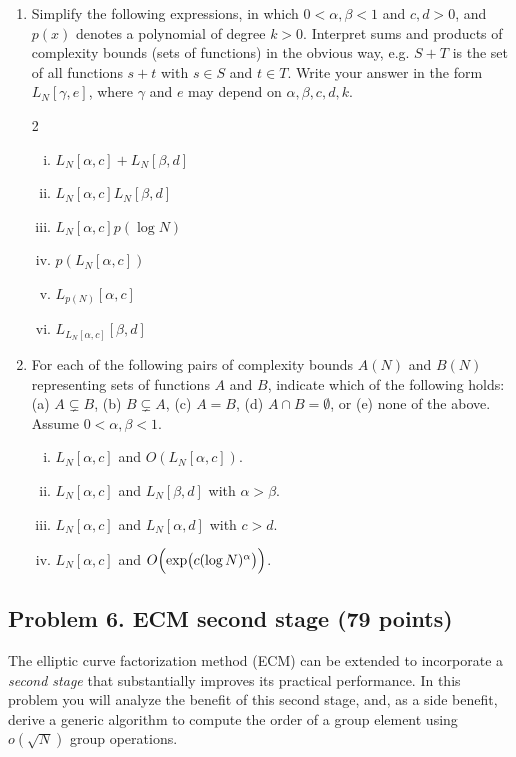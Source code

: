 \documentclass[11pt]{article}
\theoremstyle{definition}
\begin{document}
\begin{enumerate}[{\bf (a)}]
\item Simplify the following expressions, in which $0 <\alpha,\beta <1$ and $c,d>0$, and $p(x)$ denotes a polynomial of degree $k>0$.
Interpret sums and products of complexity bounds (sets of functions) in the obvious way, e.g. $S+T$ is the set of all functions $s+t$ with $s\in S$ and $t\in T$.  Write your answer in the form $L_N[\gamma,e]$, where $\gamma$ and $e$ may depend on $\alpha,\beta,c,d,k$.
\begin{multicols}{2}
\begin{enumerate}[(i)]
\item $L_N[\alpha,c]+L_N[\beta,d]$
\item $L_N[\alpha,c]L_N[\beta,d]$
\item $L_N[\alpha,c]p(\log N)$
\item $p(L_N[\alpha,c])$
\item $L_{p(N)}[\alpha,c]$
\item $L_{L_N[\alpha,c]}[\beta,d]$
\end{enumerate}
\end{multicols}

\item
For each of the following pairs of complexity bounds $A(N)$ and $B(N)$ representing sets of functions $A$ and $B$, indicate which of the following holds: (a) $A\subsetneq B$, (b) $B\subsetneq A$, (c) $A=B$, (d) $A\cap B=\emptyset$, or (e) none of the above.
Assume $0<\alpha,\beta <1$.
\begin{enumerate}[(i)]
\item $L_N[\alpha,c]$ and $O(L_N[\alpha,c])$.
\item $L_N[\alpha,c]$ and $L_N[\beta,d]$ with $\alpha > \beta$.
\item $L_N[\alpha,c]$ and $L_N[\alpha,d]$ with $c>d$.
\item $L_N[\alpha,c]$ and $O\Bigl(\exp\bigl(c(\log N)^\alpha\bigr)\Bigr)$.
\end{enumerate}
\end{enumerate}

\subsection*{Problem 6. ECM second stage (79 points)}
The elliptic curve factorization method (ECM) can be extended to incorporate a \emph{second stage} that substantially improves its practical performance.
In this problem you will analyze the benefit of this second stage, and, 
as a side benefit, derive a generic algorithm to compute the order of a group element using $o(\sqrt{N})$ group operations.
\end{document}

